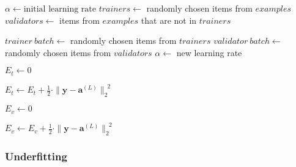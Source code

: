 \documentclass{article}
\begin{document}
      \begin{algorithm}
        \caption{%
          Modified version of algorithm \ref{alglearn} with validation.
        } \label{alglearnval}
        \begin{algorithmic}
            \State $\alpha \gets \text{initial learning rate}$
            \State {}
            \State $trainers \gets$ randomly chosen items from $examples$
            \State $validators \gets$ items from $examples$ that are not in $trainers$

            \Repeat
              \State $trainer\ batch \gets$ randomly chosen items from $trainers$
              \State $validator\ batch \gets$ randomly chosen items from $validators$
              \State {}
              \State {}
              \State {}
              \State {}
              \State $\alpha \gets$ new learning rate
          \EndProcedure

            \State $E_t \gets 0$

              \State {}
              \State {}
              \State $
                E_t \gets
                  E_t
                  +
                  \frac{1}{2}
                  \cdot
                  \| \mathbf{y} - \mathbf{a}^{(L)} \|_2^{\enspace 2}
              $
            \EndFor
          \EndProcedure

            \State $E_v \gets 0$

              \State {}
              \State $
                E_v \gets
                  E_v
                  +
                  \frac{1}{2}
                  \cdot
                  \| \mathbf{y} - \mathbf{a}^{(L)} \|_2^{\enspace 2}
              $
            \EndFor
          \EndProcedure
        \end{algorithmic}
      \end{algorithm}

      \subsubsection{Underfitting}
\end{document}
